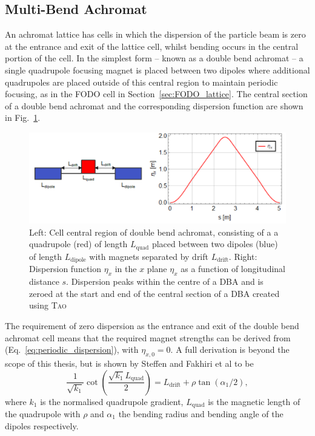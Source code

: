 \documentclass[../main.tex]{subfiles}
\begin{document}
\subsection{Multi-Bend Achromat}

An achromat lattice has cells in which the dispersion of the particle beam is zero at the entrance and exit of the lattice cell, whilst bending occurs in the central portion of the cell. In the simplest form -- known as a double bend achromat -- a single quadrupole focusing magnet is placed between two dipoles where additional quadrupoles are placed outside of this central region to maintain periodic focusing, as in the FODO cell in Section~\ref{sec:FODO_lattice}. The central section of a double bend achromat and the corresponding dispersion function are shown in Fig.~\ref{fig:DBA_diagram}.

\begin{figure}[!h]
\centering
\includegraphics[width=\textwidth]{Figures/Energy_Recovery_Linac_Design/DBA_diagram.pdf}
\caption{Left: Cell central region of double bend achromat, consisting of a a quadrupole (red) of length $L_{\mathrm{quad}}$ placed between two dipoles (blue) of length $L_{\mathrm{dipole}}$ with magnets separated by drift $L_{\mathrm{drift}}$. Right: Dispersion function $\eta_{x}$ in the $x$ plane $\eta_{x}$ as a function of longitudinal distance $s$. Dispersion peaks within the centre of a DBA and is zeroed at the start and end of the central section of a DBA created using \textsc{Tao} \cite{TaoManual}}
\label{fig:DBA_diagram}
\end{figure}

The requirement of zero dispersion as the entrance and exit of the double bend achromat cell means that the required magnet strengths can be derived from (Eq.~\ref{eq:periodic_dispersion}), with $\eta_{x,0}=0$.
A full derivation is beyond the scope of this thesis, but is shown by Steffen \cite{steffen1983periodic} and Fakhiri et al \cite{fakhri2015analytical} to be
\begin{equation}
\frac{1}{\sqrt{k_{1}}}\cot\left(\frac{\sqrt{k_{1}}L_{\mathrm{quad}}}{2}\right) = L_{\mathrm{drift}} + \rho\tan\left(\alpha_{1}/2\right),
\label{eq:DBA_magnets}
\end{equation}
where $k_{1}$ is the normalised quadrupole gradient, $L_{\mathrm{quad}}$ is the magnetic length of the quadrupole with $\rho$ and $\alpha_{1}$ the bending radius and bending angle of the dipoles respectively. 
\end{document}
